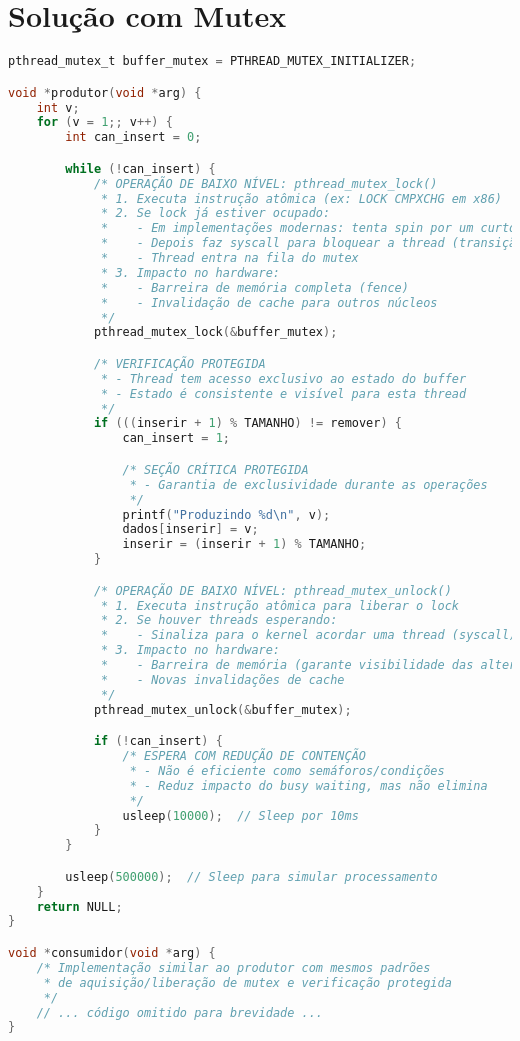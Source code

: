 \documentclass[12pt]{article}
\begin{document}
\section{Solução com Mutex}

\begin{lstlisting}[language=C, caption=Implementação com Mutex]
pthread_mutex_t buffer_mutex = PTHREAD_MUTEX_INITIALIZER;

void *produtor(void *arg) {
    int v;
    for (v = 1;; v++) {
        int can_insert = 0;

        while (!can_insert) {
            /* OPERAÇÃO DE BAIXO NÍVEL: pthread_mutex_lock()
             * 1. Executa instrução atômica (ex: LOCK CMPXCHG em x86)
             * 2. Se lock já estiver ocupado:
             *    - Em implementações modernas: tenta spin por um curto período
             *    - Depois faz syscall para bloquear a thread (transição para kernel)
             *    - Thread entra na fila do mutex
             * 3. Impacto no hardware:
             *    - Barreira de memória completa (fence)
             *    - Invalidação de cache para outros núcleos
             */
            pthread_mutex_lock(&buffer_mutex);

            /* VERIFICAÇÃO PROTEGIDA
             * - Thread tem acesso exclusivo ao estado do buffer
             * - Estado é consistente e visível para esta thread
             */
            if (((inserir + 1) % TAMANHO) != remover) {
                can_insert = 1;

                /* SEÇÃO CRÍTICA PROTEGIDA
                 * - Garantia de exclusividade durante as operações
                 */
                printf("Produzindo %d\n", v);
                dados[inserir] = v;
                inserir = (inserir + 1) % TAMANHO;
            }

            /* OPERAÇÃO DE BAIXO NÍVEL: pthread_mutex_unlock()
             * 1. Executa instrução atômica para liberar o lock
             * 2. Se houver threads esperando:
             *    - Sinaliza para o kernel acordar uma thread (syscall)
             * 3. Impacto no hardware:
             *    - Barreira de memória (garante visibilidade das alterações)
             *    - Novas invalidações de cache
             */
            pthread_mutex_unlock(&buffer_mutex);

            if (!can_insert) {
                /* ESPERA COM REDUÇÃO DE CONTENÇÃO
                 * - Não é eficiente como semáforos/condições
                 * - Reduz impacto do busy waiting, mas não elimina
                 */
                usleep(10000);  // Sleep por 10ms
            }
        }

        usleep(500000);  // Sleep para simular processamento
    }
    return NULL;
}

void *consumidor(void *arg) {
    /* Implementação similar ao produtor com mesmos padrões
     * de aquisição/liberação de mutex e verificação protegida
     */
    // ... código omitido para brevidade ...
}
\end{lstlisting}
\end{document}
